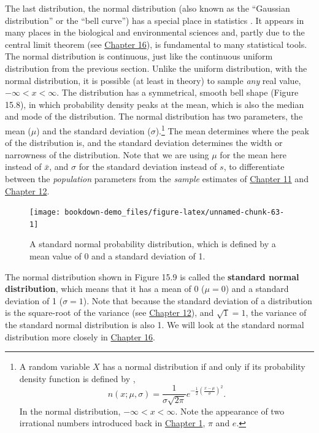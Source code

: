 \documentclass[
]{scrbook}
\begin{document}
The last distribution, the normal distribution (also known as the ``Gaussian distribution'' or the ``bell curve'') has a special place in statistics \citep{Miller2004, Navarro2022}.
It appears in many places in the biological and environmental sciences and, partly due to the central limit theorem (see \protect\hyperlink{Chapter_16}{Chapter 16}), is fundamental to many statistical tools.
The normal distribution is continuous, just like the continuous uniform distribution from the previous section.
Unlike the uniform distribution, with the normal distribution, it is possible (at least in theory) to sample \emph{any} real value, \(-\infty < x < \infty\).
The distribution has a symmetrical, smooth bell shape (Figure 15.8), in which probability density peaks at the mean, which is also the median and mode of the distribution.
The normal distribution has two parameters, the mean (\(\mu\)) and the standard deviation (\(\sigma\)).\footnote{A random variable \(X\) has a normal distribution if and only if its probability density function is defined by \citep{Miller2004}, \[n\left(x; \mu, \sigma\right) = \frac{1}{\sigma\sqrt{2\pi}}e^{-\frac{1}{2}\left(\frac{x - \mu}{\sigma}\right)^{2}}.\] In the normal distribution, \(-\infty < x < \infty\). Note the appearance of two irrational numbers introduced back in \protect\hyperlink{Chapter_1}{Chapter 1}, \(\pi\) and \(e\).}
The mean determines where the peak of the distribution is, and the standard deviation determines the width or narrowness of the distribution.
Note that we are using \(\mu\) for the mean here instead of \(\bar{x}\), and \(\sigma\) for the standard deviation instead of \(s\), to differentiate between the \emph{population} parameters from the \emph{sample} estimates of \protect\hyperlink{Chapter_11}{Chapter 11} and \protect\hyperlink{Chapter_12}{Chapter 12}.

\begin{figure}
\texttt{[image: bookdown-demo\_files/figure-latex/unnamed-chunk-63-1]} \caption{A standard normal probability distribution, which is defined by a mean value of 0 and a standard deviation of 1.}\label{fig:unnamed-chunk-63}
\end{figure}

The normal distribution shown in Figure 15.9 is called the \textbf{standard normal distribution}, which means that it has a mean of 0 (\(\mu = 0\)) and a standard deviation of 1 (\(\sigma = 1\)).
Note that because the standard deviation of a distribution is the square-root of the variance (see \protect\hyperlink{Chapter_12}{Chapter 12}), and \(\sqrt{1} = 1\), the variance of the standard normal distribution is also 1.
We will look at the standard normal distribution more closely in \protect\hyperlink{Chapter_16}{Chapter 16}.
\end{document}
